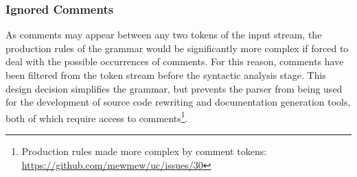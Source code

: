 \subsubsection{Ignored Comments}

As comments may appear between any two tokens of the input stream, the production rules of the grammar would be significantly more complex if forced to deal with the possible occurrences of comments. For this reason, comments have been filtered from the token stream before the syntactic analysis stage. This design decision simplifies the grammar, but prevents the parser from being used for the development of source code rewriting and documentation generation tools, both of which require access to comments\footnote{Production rules made more complex by comment tokens: \url{https://github.com/mewmew/uc/issues/30}}.
